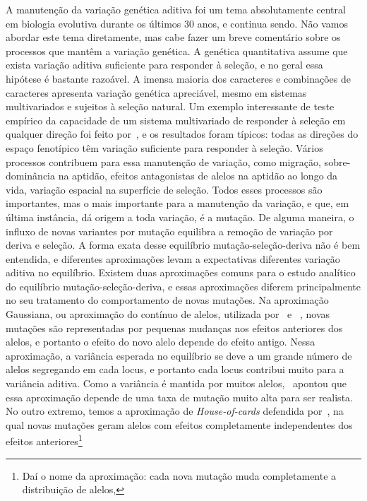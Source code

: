 \begin{refsection}
A manutenção da variação genética aditiva foi um tema absolutamente central em
biologia evolutiva durante os últimos 30 anos, e continua sendo. Não vamos
abordar este tema diretamente, mas cabe fazer um breve comentário sobre os
processos que mantêm a variação genética. A genética quantitativa assume que
exista variação aditiva suficiente para responder à seleção, e no geral essa
hipótese é bastante razoável. A imensa maioria dos caracteres e combinações de
caracteres apresenta variação genética apreciável, mesmo em sistemas
multivariados e sujeitos à seleção natural. Um exemplo interessante de teste
empírico da capacidade de um sistema multivariado de responder à seleção em
qualquer direção foi feito por~\textcite{Hine2014-ps}, e os resultados foram
típicos: todas as direções do espaço fenotípico têm variação suficiente para
responder à seleção. Vários processos contribuem para essa manutenção de
variação, como migração, sobre-dominância na aptidão, efeitos antagonistas de
alelos na aptidão ao longo da vida, variação espacial na superfície de
seleção. Todos esses processos são importantes, mas o mais importante para a
manutenção da variação, e que, em última instância, dá origem a toda variação,
é a mutação. De alguma maneira, o influxo de novas variantes por mutação
equilibra a remoção de variação por deriva e seleção. A forma exata desse
equilíbrio mutação-seleção-deriva não é bem entendida, e diferentes
aproximações levam a expectativas diferentes variação aditiva no equilíbrio.
Existem duas aproximações comuns para o estudo analítico do equilíbrio
mutação-seleção-deriva, e essas aproximações diferem principalmente no seu
tratamento do comportamento de novas mutações. Na aproximação Gaussiana, ou
aproximação do contínuo de alelos, utilizada por~\textcite{Kimura1965-ax}
e~\textcite{Lande1975-me} , novas mutações são representadas por pequenas
mudanças nos efeitos anteriores dos alelos, e portanto o efeito do novo alelo
depende do efeito antigo. Nessa aproximação, a variância esperada no
equilíbrio se deve a um grande número de alelos segregando em cada locus, e
portanto cada locus contribui muito para a variância aditiva. Como a variância
é mantida por muitos alelos,~\textcite{Turelli1984-cp} apontou que essa
aproximação depende de uma taxa de mutação muito alta para ser realista. No
outro extremo, temos a aproximação de \textit{House-of-cards} defendida
por~\textcite{Turelli1984-cp}, na qual novas mutações geram alelos com efeitos
completamente independentes dos efeitos anteriores\footnote{Daí o nome da
aproximação: cada nova mutação muda completamente a distribuição de alelos,
}
\end{refsection}
